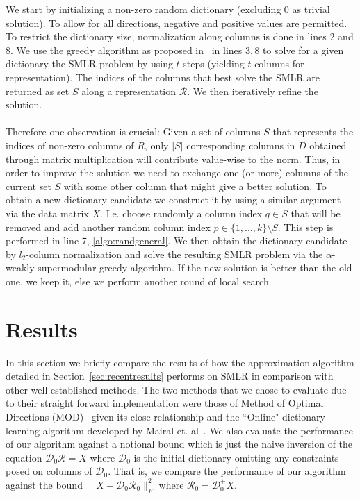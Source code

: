 \documentclass{article}
\newcommand{\Rr}{\mathcal{R}}
\newcommand{\D}{\mathcal{D}}
\begin{document}
\noindent We start by initializing a non-zero random dictionary (excluding $0$ as trivial solution). To allow for all directions, negative and positive values are permitted. To restrict the dictionary size, normalization along columns is done in lines $2$ and $8$. We use the greedy algorithm as proposed in~\cite{weaklyalpha} in lines $3, 8$ to solve for a given dictionary the SMLR problem by using $t$ steps (yielding $t$ columns for representation). The indices of the columns that best solve the SMLR are returned as set $S$ along a representation $\Rr$. We then iteratively refine the solution.
\\
\\
Therefore one observation is crucial: Given a set of columns $S$ that represents the indices of non-zero columns of $R$, only $|S|$ corresponding columns in $D$ obtained through matrix multiplication will contribute value-wise to the norm. Thus, in order to improve the solution we need to exchange one (or more) columns of the current set $S$ with some other column that might give a better solution. To obtain a new dictionary candidate we construct it by using a similar argument via the data matrix $X$. I.e. choose randomly a column index $q \in S$ that will be removed and add another random column index $p \in \lbrace 1, ..., k \rbrace \setminus S$. This step is performed in line 7, \ref{algo:randgeneral}. We then obtain the dictionary candidate by $l_2$-column normalization and solve the resulting SMLR problem via the $\alpha$-weakly supermodular greedy algorithm. If the new solution is better than the old one, we keep it, else we perform another round of local search.
\section{Results}\label{sec:results}

In this section we briefly compare the results of how the approximation algorithm detailed in Section~\ref{sec:recentresults} performs on SMLR in comparison with other well established methods. The two methods that we chose to evaluate due to their straight forward implementation were those of Method of Optimal Directions (MOD)~\cite{MOD} given its close relationship and the ``Online" dictionary learning algorithm developed by Mairal et. al~\cite{mairal09}. We also evaluate the performance of our algorithm against a notional bound which is just the naive inversion of the equation $\D_0\Rr = X$ where $\D_0$ is the initial dictionary omitting any constraints posed on columns of $\D_0$. That is, we compare the performance of our algorithm against the bound $\|X-\D_0\Rr_0\|_F^2$ where $\Rr_0 = \D_0^+ X$.
\end{document}
